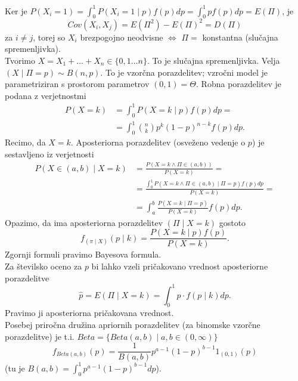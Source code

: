 \documentclass[a4paper, 12pt]{book}
\theoremstyle{definition}
\theoremstyle{remark}
\begin{document}
Ker je $P(X_i = 1) = \int_{0}^{1} P(X_i = 1 \mid p) f(p) dp = \int_{0}^{1} p f(p) dp = E(\Pi)$, je
\begin{equation*}
  Cov(X_i, X_j) = E(\Pi^2) - E(\Pi)^2 = D(\Pi)
\end{equation*}
za $i \neq j$, torej so $X_i$ brezpogojno neodvisne $\iff$ $\Pi =$ konstantna (slučajna spremenljivka). \\
Tvorimo $X = X_1 + \dots + X_n \in \{0, 1 \dots n\}$.
To je  slučajna spremenljivka.
Velja $(X\mid \Pi = p) \sim B(n,p)$.
To je vzorčna porazdelitev; vzročni model je parametriziran s prostorom parametrov $(0,1) = \Theta$.
Robna porazdelitev je podana z verjetnostmi
\begin{align*}
  P(X = k) &= \int_{0}^{1} P(X = k \mid p) f(p) dp = \\
  &= \int_{0}^{1} \binom{n}{k} p^k (1-p)^{n-k} f(p) dp.
\end{align*}
Recimo, da  $X = k$. Aposteriorna porazdelitev (osveženo vedenje o $p$) je sestavljeno iz verjetnosti
\begin{align*}
  P(X \in (a,b) \mid X = k) &= \frac{P(X = k \land \Pi \in (a,b))}{P(X = k)} = \\
  &= \frac{\int_{0}^{1} P(X = k \land \Pi \in (a,b) \mid \Pi = p) f(p) dp}{P(X = k)} = \\
  &= \int_{a}^{b} \frac{P(X = k \mid \Pi = p)}{P(X = k)} f(p) dp.
\end{align*}
Opazimo, da ima aposteriorna porazdelitev $(\Pi \mid X = k)$ gostoto
\begin{equation*}
  f_{(\pi \mid X)}(p \mid k) = \frac{P(X = k \mid p) f(p)}{P(X = k)}.
\end{equation*}
Zgornji formuli pravimo Bayesova formula. \\
Za številsko oceno za $p$ bi lahko vzeli pričakovano vrednost aposteriorne porazdelitve
\begin{equation*}
  \hat{p} = E(\Pi \mid X = k) = \int_{0}^{1} p \cdot f(p \mid k) dp.
\end{equation*}
Pravimo ji aposteriorna pričakovana vrednost. \\
Posebej priročna družina apriornih porazdelitev (za binomske vzorčne porazdelitve) je t.i.
$Beta = \{Beta(a,b) \mid a,b \in (0, \infty)\}$
\begin{equation*}
  f_{Beta(a,b)}(p) = \frac{1}{B(a,b)} p^{a-1} (1-p)^{b-1} 1_{(0,1)}(p)
\end{equation*}
(tu je $B(a,b) = \int_{0}^{1} p^{a-1} (1-p)^{b-1} dp$). \\
\end{document}
